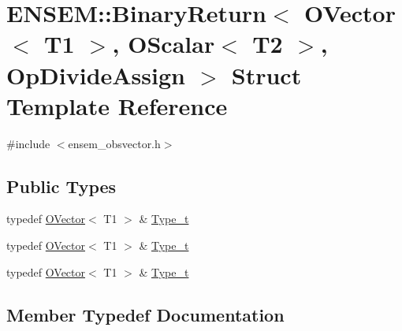 \hypertarget{structENSEM_1_1BinaryReturn_3_01OVector_3_01T1_01_4_00_01OScalar_3_01T2_01_4_00_01OpDivideAssign_01_4}{}\section{E\+N\+S\+EM\+:\+:Binary\+Return$<$ O\+Vector$<$ T1 $>$, O\+Scalar$<$ T2 $>$, Op\+Divide\+Assign $>$ Struct Template Reference}
\label{structENSEM_1_1BinaryReturn_3_01OVector_3_01T1_01_4_00_01OScalar_3_01T2_01_4_00_01OpDivideAssign_01_4}


{\ttfamily \#include $<$ensem\+\_\+obsvector.\+h$>$}

\subsection*{Public Types}
\begin{DoxyCompactItemize}
\item 
typedef \mbox{\hyperlink{classENSEM_1_1OVector}{O\+Vector}}$<$ T1 $>$ \& \mbox{\hyperlink{structENSEM_1_1BinaryReturn_3_01OVector_3_01T1_01_4_00_01OScalar_3_01T2_01_4_00_01OpDivideAssign_01_4_ab2bcb8c826e18a2c69b8d9122e888059}{Type\+\_\+t}}
\item 
typedef \mbox{\hyperlink{classENSEM_1_1OVector}{O\+Vector}}$<$ T1 $>$ \& \mbox{\hyperlink{structENSEM_1_1BinaryReturn_3_01OVector_3_01T1_01_4_00_01OScalar_3_01T2_01_4_00_01OpDivideAssign_01_4_ab2bcb8c826e18a2c69b8d9122e888059}{Type\+\_\+t}}
\item 
typedef \mbox{\hyperlink{classENSEM_1_1OVector}{O\+Vector}}$<$ T1 $>$ \& \mbox{\hyperlink{structENSEM_1_1BinaryReturn_3_01OVector_3_01T1_01_4_00_01OScalar_3_01T2_01_4_00_01OpDivideAssign_01_4_ab2bcb8c826e18a2c69b8d9122e888059}{Type\+\_\+t}}
\end{DoxyCompactItemize}


\subsection{Member Typedef Documentation}
\mbox{\label{structENSEM_1_1BinaryReturn_3_01OVector_3_01T1_01_4_00_01OScalar_3_01T2_01_4_00_01OpDivideAssign_01_4_ab2bcb8c826e18a2c69b8d9122e888059}} 
